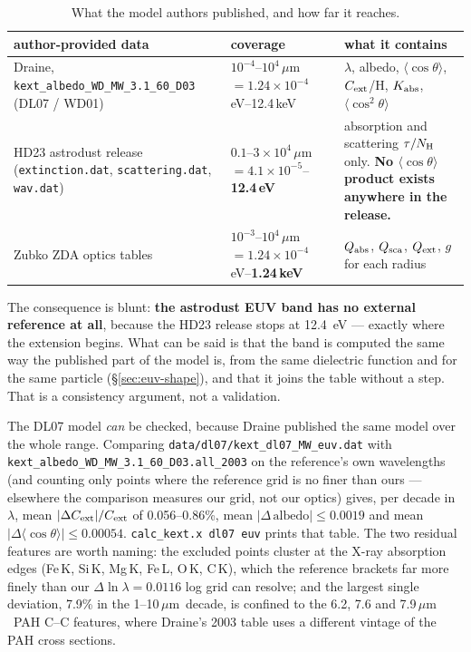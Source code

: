 \documentclass{my_memo}
\newcommand{\code}[1]{\texttt{#1}}
\newcommand{\um}{\ensuremath{\,\mu\mathrm{m}}}
\begin{document}
\begin{table}[h]
\centering
\small
\begin{tabular}{@{}L{0.30\textwidth}L{0.24\textwidth}L{0.38\textwidth}@{}}
\toprule
author-provided data & coverage & what it contains \\
\midrule
Draine, \code{kext\_albedo\_WD\_MW\_3.1\_60\_D03} (DL07 / WD01) &
$10^{-4}$--$10^{4}$\um\ $=1.24\times10^{-4}$\,eV--12.4\,keV &
$\lambda$, albedo, $\langle\cos\theta\rangle$, $C_{\rm ext}$/H, $K_{\rm abs}$,
$\langle\cos^2\theta\rangle$ \\
HD23 astrodust release (\code{extinction.dat}, \code{scattering.dat},
\code{wav.dat}) &
$0.1$--$3\times10^{4}$\um\ $=4.1\times10^{-5}$--\textbf{12.4\,eV} &
absorption and scattering $\tau/N_{\rm H}$ only. \textbf{No
$\langle\cos\theta\rangle$ product exists anywhere in the release.} \\
Zubko ZDA optics tables &
$10^{-3}$--$10^{4}$\um\ $=1.24\times10^{-4}$\,eV--\textbf{1.24\,keV} &
$Q_{\rm abs}$, $Q_{\rm sca}$, $Q_{\rm ext}$, $g$ for each radius \\
\bottomrule
\end{tabular}
\caption{What the model authors published, and how far it reaches.}
\label{tab:refcoverage}
\end{table}

\noindent The consequence is blunt: \textbf{the astrodust EUV band has no
external reference at all}, because the HD23 release stops at
\SI{12.4}{\electronvolt} --- exactly where the extension begins. What can be
said is that the band is computed the same way the published part of the model
is, from the same dielectric function and for the same particle
(\S\ref{sec:euv-shape}), and that it joins the table without a step. That is a
consistency argument, not a validation.

The DL07 model \emph{can} be checked, because Draine published the same model
over the whole range. Comparing \code{data/dl07/kext\_dl07\_MW\_euv.dat} with
\code{kext\_albedo\_WD\_MW\_3.1\_60\_D03.all\_2003} on the reference's own
wavelengths (and counting only points where the reference grid is no finer than
ours --- elsewhere the comparison measures our grid, not our optics) gives, per
decade in $\lambda$, mean $|\Delta C_{\rm ext}|/C_{\rm ext}$ of
0.056--0.86\%, mean $|\Delta\,\mathrm{albedo}|\le0.0019$ and mean
$|\Delta\langle\cos\theta\rangle|\le0.00054$. \code{calc\_kext.x dl07 euv}
prints that table. The two residual features are worth naming: the excluded
points cluster at the X-ray absorption edges (Fe\,K, Si\,K, Mg\,K, Fe\,L, O\,K,
C\,K), which the reference brackets far more finely than our
$\Delta\ln\lambda = 0.0116$ log grid can resolve; and the largest single
deviation, 7.9\% in the 1--10\um\ decade, is confined to the 6.2, 7.6 and
7.9\um\ PAH C--C features, where Draine's 2003 table uses a different vintage of
the PAH cross sections.
\end{document}
